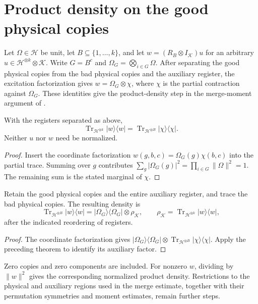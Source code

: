 \section{Product density on the good physical copies}
\label{sec:replica_good_copy_density}

Let $\Omega\in\mathcal H$ be unit, let $B\subseteq\{1,\ldots,k\}$, and
let $w=(R_B\otimes I_{\mathcal K})u$ for an arbitrary
$u\in\mathcal H^{\otimes k}\otimes\mathcal K$.
Write $G=B^c$ and $\Omega_G=\bigotimes_{i\in G}\Omega$.
After separating the good physical copies from the bad physical copies and
the auxiliary register, the excitation factorization gives
$w=\Omega_G\otimes\chi$, where $\chi$ is the partial contraction against
$\Omega_G$. These identities give the product-density step in the
merge-moment argument of \cite[Section~7]{OpenAI2026AreaLaw}.

\begin{theorem}
\label{thm:replica_good_copy_auxiliary_density}
\leanok
{}
With the registers separated as above,
\[
 \operatorname{Tr}_{\mathcal H^{\otimes k}}|w\rangle\langle w|
 =\operatorname{Tr}_{\mathcal H^{\otimes B}}|\chi\rangle\langle\chi|.
\]
Neither $u$ nor $w$ need be normalized.
\end{theorem}
\begin{proof}
\leanok
{}
Insert the coordinate factorization $w(g,b,c)=\Omega_G(g)\chi(b,c)$
into the partial trace. Summing over $g$ contributes
$\sum_g|\Omega_G(g)|^2=\prod_{i\in G}\|\Omega\|^2=1$.
The remaining sum is the stated marginal of $\chi$.
\end{proof}

\begin{theorem}
\label{thm:replica_good_copy_product_density}
\leanok
{}
Retain the good physical copies and the entire auxiliary register, and
trace the bad physical copies. The resulting density is
\[
 \operatorname{Tr}_{\mathcal H^{\otimes B}}|w\rangle\langle w|
 =|\Omega_G\rangle\langle\Omega_G|\otimes\rho_{\mathcal K},
 \qquad
 \rho_{\mathcal K}=\operatorname{Tr}_{\mathcal H^{\otimes k}}
                  |w\rangle\langle w|,
\]
after the indicated reordering of registers.
\end{theorem}
\begin{proof}
\leanok
{}
The coordinate factorization gives
$|\Omega_G\rangle\langle\Omega_G|\otimes
\operatorname{Tr}_{\mathcal H^{\otimes B}}|\chi\rangle\langle\chi|$.
Apply the preceding theorem to identify its auxiliary factor.
\end{proof}

Zero copies and zero components are included. For nonzero $w$, dividing by
$\|w\|^2$ gives the corresponding normalized product density. Restrictions to
the physical and auxiliary regions used in the merge estimate, together with
their permutation symmetries and moment estimates, remain further steps.
